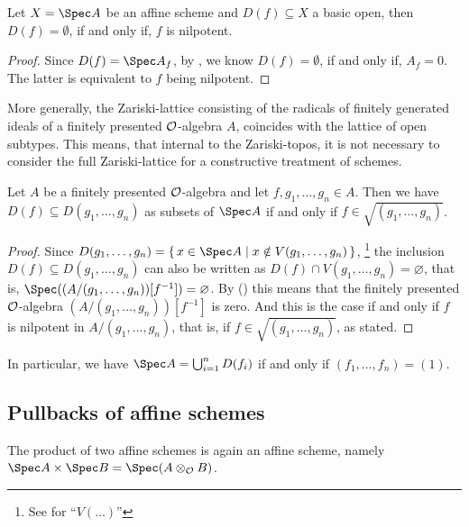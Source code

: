 \begin{lemma}%
  \label{basic-open-empty}
  Let $X=\Spec A$ be an affine scheme and $D(f)\subseteq X$ a basic open,
  then $D(f)=\emptyset$, if and only if, $f$ is nilpotent.
\end{lemma}

\begin{proof}
  Since $D(f)=\Spec A_f$, by , we know $D(f)=\emptyset$,
  if and only if, $A_f=0$.
  The latter is equivalent to $f$ being nilpotent.
\end{proof}

More generally,
the Zariski-lattice consisting of the radicals
of finitely generated ideals of a finitely presented $\mathcal O$-algebra $A$,
coincides with the lattice of open subtypes.
This means, that internal to the Zariski-topos,
it is not necessary to consider the full Zariski-lattice for a constructive treatment of schemes.

\begin{lemma}%
  Let $A$ be a finitely presented $\mathcal O$-algebra
  and let $f, g_1, \dots, g_n \in A$.
  Then we have $D(f) \subseteq D(g_1, \dots, g_n)$
  as subsets of $\Spec A$
  if and only if $f \in \sqrt{(g_1, \dots, g_n)}$.
\end{lemma}

\begin{proof}
  Since $D(g_1, \dots, g_n) = \{\, x \in \Spec A \mid x \notin V(g_1, \dots, g_n) \,\}$,
  \footnote{See  for ``$V(\dots)$''}
  the inclusion $D(f) \subseteq D(g_1, \dots, g_n)$
  can also be written as
  $D(f) \cap V(g_1, \dots, g_n) = \varnothing$, that is,
  $\Spec((A/(g_1, \dots, g_n))[f^{-1}]) = \varnothing$.
  By ()
  this means that the finitely presented $\mathcal O$-algebra $(A/(g_1, \dots, g_n))[f^{-1}]$
  is zero.
  And this is the case if and only if $f$ is nilpotent in $A/(g_1, \dots, g_n)$,
  that is, if $f \in \sqrt{(g_1, \dots, g_n)}$, as stated.
\end{proof}

In particular,
we have $\Spec A = \bigcup_{i = 1}^n D(f_i)$
if and only if $(f_1, \dots, f_n) = (1)$.

\subsection{Pullbacks of affine schemes}

\begin{lemma}%
  \label{affine-product}
  The product of two affine schemes is again an affine scheme,
  namely
  $\Spec A \times \Spec B = \Spec (A \otimes_\A B)$.
\end{lemma}

